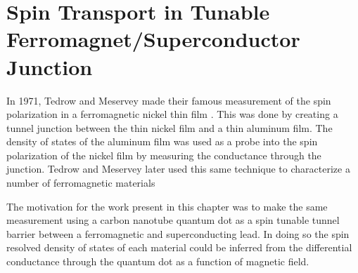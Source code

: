 \chapter{Spin Transport in Tunable Ferromagnet/Superconductor Junction}
\label{sec:SCFM}

%
%
%
%


In 1971, Tedrow and Meservey made their famous measurement of the spin polarization in a ferromagnetic nickel thin film \cite{Tedrow1971}. This was done by creating a tunnel junction between the thin nickel film and a thin aluminum film. The density of states of the aluminum film was used as a probe into the spin polarization of the nickel film by measuring the conductance through the junction. Tedrow and Meservey later used this same technique to characterize a number of ferromagnetic materials \cite{Tedrow1973}

The motivation for the work present in this chapter was to make the same measurement using a carbon nanotube quantum dot as a spin tunable tunnel barrier between a ferromagnetic and superconducting lead. In doing so the spin resolved density of states of each material could be inferred from the differential conductance through the quantum dot as a function of magnetic field.

